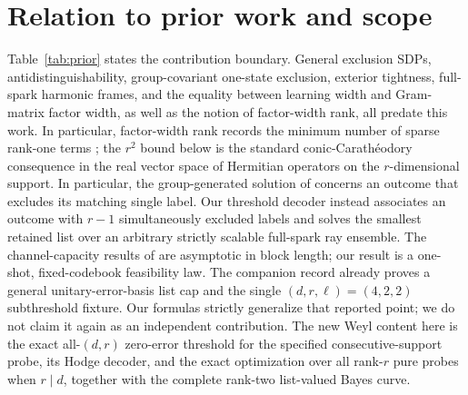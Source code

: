 \documentclass[11pt,a4paper]{article}
\begin{document}
\section{Relation to prior work and scope}

Table~\ref{tab:prior} states the contribution boundary.  General exclusion
SDPs, antidistinguishability, group-covariant one-state exclusion, exterior
tightness, full-spark harmonic frames, and the equality between learning
width and Gram-matrix factor width, as well as the notion of factor-width
rank, all predate this work.
In particular, factor-width rank records the minimum number of sparse
rank-one terms \cite{JohnstonMoeinPlosker2025}; the $r^2$ bound below is the
standard conic-Carath\'eodory consequence in the real vector space of
Hermitian operators on the $r$-dimensional support.  In
particular, the group-generated solution of \cite{DiebraEtAl2026} concerns an
outcome that excludes its matching single label.  Our threshold decoder
instead associates an outcome with $r-1$ simultaneously excluded labels and
solves the smallest retained list over an arbitrary strictly scalable
full-spark ray ensemble.
The channel-capacity results of \cite{DalaiGirardiLami2026} are asymptotic in
block length; our result is a one-shot, fixed-codebook feasibility law.
The companion record \cite{ErikssonMatroidUnion2026} already proves a general
unitary-error-basis list cap and the single $(d,r,\ell)=(4,2,2)$
subthreshold fixture.  Our formulas strictly generalize that reported point;
we do not claim it again as an independent contribution.  The new Weyl
content here is the exact all-$(d,r)$ zero-error threshold for the specified
consecutive-support probe, its Hodge decoder, and the exact optimization over
all rank-$r$ pure probes when $r\mid d$, together with the complete
rank-two list-valued Bayes curve.
\end{document}
